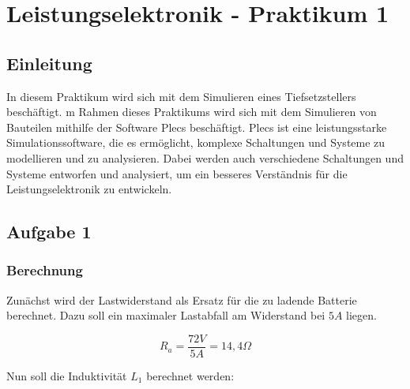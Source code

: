 \documentclass{report}
\begin{document}

\newpage

\tableofcontents

\listoffigures

\newpage
\chapter{Leistungselektronik - Praktikum 1}
\section{Einleitung}

In diesem Praktikum wird sich mit dem Simulieren eines Tiefsetzstellers beschäftigt. m Rahmen dieses Praktikums wird sich mit dem Simulieren von Bauteilen mithilfe der Software Plecs beschäftigt. Plecs ist eine leistungsstarke Simulationssoftware, die es ermöglicht, komplexe Schaltungen und Systeme zu modellieren und zu analysieren. Dabei werden auch verschiedene Schaltungen und Systeme entworfen und analysiert, um ein besseres Verständnis für die Leistungselektronik zu entwickeln.

\section{Aufgabe 1}
\subsection{Berechnung}
Zunächst wird der Lastwiderstand als Ersatz für die zu ladende Batterie berechnet. Dazu soll ein maximaler Lastabfall am Widerstand bei $5A$ liegen.


\begin{equation}
	R_{a} = \frac{72V}{5A} = 14,4\Omega
	\label{eq:Lastwiderstand}
\end{equation}

Nun soll die Induktivität $L_1$ berechnet werden:
\end{document}
